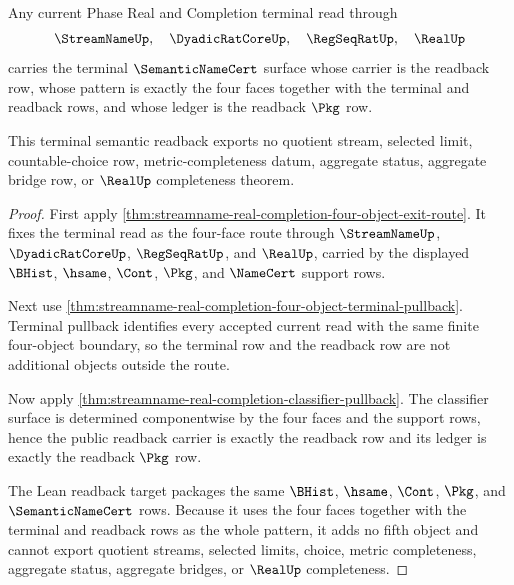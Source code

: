 \begin{theorem}
\label{thm:streamname-real-completion-terminal-semantic-readback}
Any current Phase Real and Completion terminal read through
$$
\StreamNameUp,\quad \DyadicRatCoreUp,\quad \RegSeqRatUp,\quad \RealUp
$$
carries the terminal $\SemanticNameCert$ surface whose carrier is the readback row, whose pattern is exactly the four faces together with the terminal and readback rows, and whose ledger is the readback $\Pkg$ row.

This terminal semantic readback exports no quotient stream, selected limit, countable-choice row, metric-completeness datum, aggregate status, aggregate bridge row, or $\RealUp$ completeness theorem.
\end{theorem}
\begin{proof}
First apply \autoref{thm:streamname-real-completion-four-object-exit-route}. It fixes the terminal read as the four-face route through $\StreamNameUp$, $\DyadicRatCoreUp$, $\RegSeqRatUp$, and $\RealUp$, carried by the displayed $\BHist$, $\hsame$, $\Cont$, $\Pkg$, and $\NameCert$ support rows.

Next use \autoref{thm:streamname-real-completion-four-object-terminal-pullback}. Terminal pullback identifies every accepted current read with the same finite four-object boundary, so the terminal row and the readback row are not additional objects outside the route.

Now apply \autoref{thm:streamname-real-completion-classifier-pullback}. The classifier surface is determined componentwise by the four faces and the support rows, hence the public readback carrier is exactly the readback row and its ledger is exactly the readback $\Pkg$ row.

The Lean readback target packages the same $\BHist$, $\hsame$, $\Cont$, $\Pkg$, and $\SemanticNameCert$ rows. Because it uses the four faces together with the terminal and readback rows as the whole pattern, it adds no fifth object and cannot export quotient streams, selected limits, choice, metric completeness, aggregate status, aggregate bridges, or $\RealUp$ completeness.
\end{proof}

